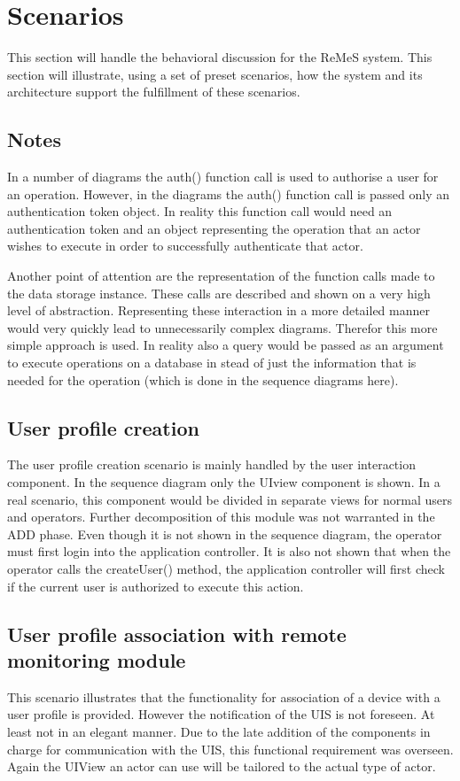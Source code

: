 \section{Scenarios}
This section will handle the behavioral discussion for the ReMeS system. This section will illustrate, 
using a set of preset scenarios, how the system and its architecture support the fulfillment 
of these scenarios.
\subsection{Notes}
In a number of diagrams the auth() function call is used to authorise a user for an operation. 
However, in the diagrams the auth() function call is passed only an authentication token object.
In reality this function call would need an authentication token and an object representing the 
operation that an actor wishes to execute in order to successfully authenticate that actor.

Another point of attention are the representation of the function calls made to the data storage instance. These calls are described and shown on a very high level of abstraction. Representing these interaction in a more detailed manner would very quickly lead to unnecessarily complex diagrams. Therefor this more simple approach is used.
In reality also a query would be passed as an argument to execute operations on a database in stead of just the information that is needed for the operation (which is done in the sequence diagrams here).
\subsection{User profile creation}
The user profile creation scenario is mainly handled by the user interaction component. 
In the sequence diagram only the UIview component is shown. In a real scenario, this component would be divided
in separate views for normal users and operators. Further decomposition of this module was not warranted in the
ADD phase. Even though it is not shown in the sequence diagram, the operator must first login into the application controller.
It is also not shown that when the operator calls the createUser() method, the application controller will first check
if the current user is authorized to execute this action.
\subsection{User profile association with remote monitoring module}
This scenario illustrates that the functionality for association of a device with a user profile is provided.
However the notification of the UIS is not foreseen. At least not in an elegant manner.
Due to the late addition of the components in charge for communication with the UIS, this functional requirement
was overseen.
Again the UIView an actor can use will be tailored to the actual type of actor. 
